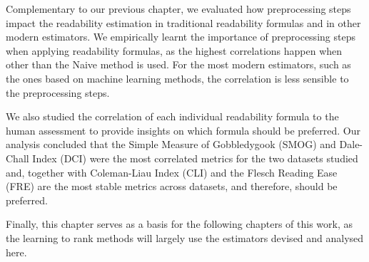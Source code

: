 \documentclass[runningheads,a4paper]{llncs}
\newcommand{\mytodo}[1]{\textcolor{red}{#1}}
\begin{document}
Complementary to our previous chapter, we evaluated how preprocessing steps impact the readability estimation in traditional readability formulas and in other modern estimators. We empirically learnt the importance of preprocessing steps when applying readability formulas, as the highest correlations happen when other than the Naive method is used.
For the most modern estimators, such as the ones based on machine learning methods, the correlation is less sensible to the preprocessing steps.

We also studied the correlation of each individual readability formula to the human assessment to provide insights on which formula should be preferred. Our analysis concluded that the Simple Measure of Gobbledygook (SMOG) and Dale-Chall Index (DCI) were the most correlated metrics for the two datasets studied and, together with Coleman-Liau Index (CLI) and the Flesch Reading Ease (FRE) are the most stable metrics across datasets, and therefore, should be preferred.

Finally, this chapter serves as a basis for the following chapters of this work, as the learning to rank methods will largely use the estimators devised and analysed here.









\end{document}
